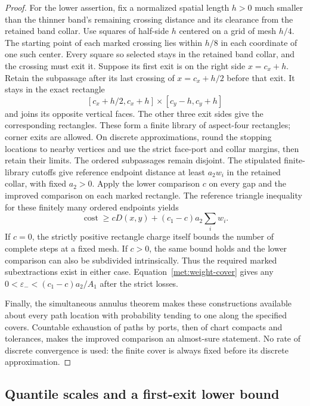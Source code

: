 \begin{proof}
For the lower assertion, fix a normalized spatial length $h>0$ much
smaller than the thinner band's remaining crossing distance and its
clearance from the retained band collar.  Use squares of half-side
$h$ centered on a grid of mesh $h/4$.  The starting point of each
marked crossing lies within $h/8$ in each coordinate of one such
center.  Every square so selected stays in the retained band collar,
and the crossing must exit it.  Suppose its first exit is on the
right side $x=c_x+h$.  Retain the subpassage after its last crossing
of $x=c_x+h/2$ before that exit.  It stays in the exact rectangle
\[
 [c_x+h/2,c_x+h]\times[c_y-h,c_y+h]
\]
and joins its opposite vertical faces.  The other three exit sides
give the corresponding rectangles.  These form a finite library of
aspect-four rectangles; corner exits are allowed.  On discrete
approximations, round the stopping locations to nearby vertices and
use the strict face-port and collar margins, then retain their limits.
The ordered subpassages remain disjoint.  The stipulated finite-library
cutoffs give reference endpoint distance at least $a_2w_i$ in the
retained collar, with fixed $a_2>0$.  Apply the lower comparison $c$
on every gap and the improved comparison on each marked rectangle.
The reference triangle inequality for these finitely many ordered
endpoints yields
\[
 \operatorname{cost}\geq cD(x,y)+(c_1-c)a_2\sum_iw_i.
\]
If $c=0$, the strictly positive rectangle charge itself bounds the
number of complete steps at a fixed mesh.  If $c>0$, the same bound
holds and the lower comparison can also be subdivided intrinsically.
Thus the required marked subextractions exist in either case.
Equation~\eqref{met:weight-cover} gives any
$0<\varepsilon_-<(c_1-c)a_2/A_1$ after the strict losses.

Finally, the simultaneous annulus theorem makes these constructions
available about every path location with probability tending to one
along the specified covers.  Countable exhaustion of paths by ports,
then of chart compacts and tolerances, makes the improved comparison
an almost-sure statement.  No rate of discrete convergence is used:
the finite cover is always fixed before its discrete approximation.
\end{proof}

\subsection{Quantile scales and a first-exit lower bound}

